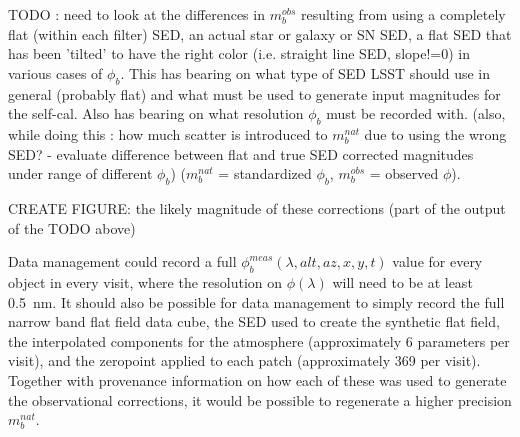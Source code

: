 \documentclass[12pt,preprint]{aastex}
\begin{document}
TODO : need to look at the differences in $m_b^{obs}$ resulting from
using a completely flat (within each filter) SED, an actual star or
galaxy or SN SED, a flat SED that has been 'tilted' to have the right
color (i.e. straight line SED, slope!=0) in various cases of
$\phi_b$. This has bearing on what type of SED LSST should use in
general (probably flat) and what must be used to generate input
magnitudes for the self-cal. Also has bearing on what resolution
$\phi_b$ must be recorded with.   (also, while doing this : how much
scatter is introduced to $m_b^{nat}$ due to using the wrong SED? -
evaluate difference between flat and true SED corrected magnitudes under range of different
$\phi_b$)  ($m_b^{nat}$ = standardized $\phi_b$, $m_b^{obs}$ =
observed $\phi$). 

CREATE FIGURE: the likely magnitude of these corrections (part of the output
of the TODO above)

Data management could record a full $\phi_b^{meas}(\lambda,alt,az,x,y,t)$ value
for every object in every visit, where the resolution on
$\phi(\lambda)$ will need to be at least 0.5~nm.  It should also be possible
for data management to simply record the full narrow band flat field
data cube, the SED used to create the synthetic flat field, 
the interpolated components for the atmosphere (approximately 6
parameters per visit), and the zeropoint applied to each patch
(approximately 369 per visit). Together with provenance information on
how each of these was used to generate the observational corrections,
it would be possible to regenerate a higher precision $m_b^{nat}$. 






\end{document}
